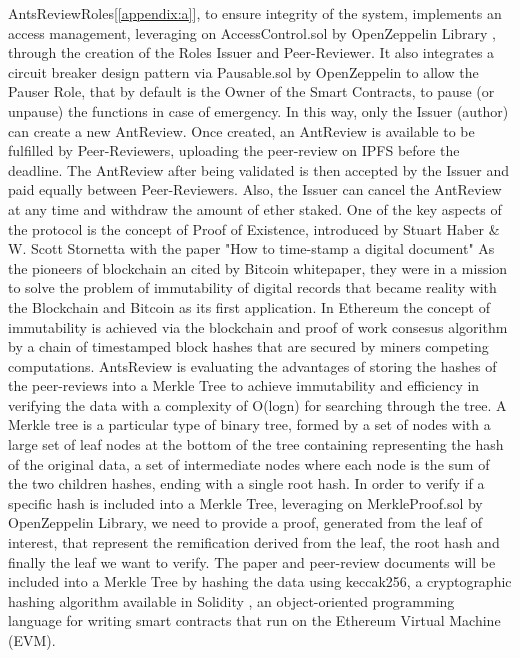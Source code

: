 \documentclass[runningheads]{llncs}
\begin{document}
AntsReviewRoles[\ref{appendix:a}], to ensure integrity of the system, implements an access management, leveraging on AccessControl.sol by OpenZeppelin Library \cite{OZ}, through the creation of the Roles Issuer and Peer-Reviewer.
\newline It also integrates a circuit breaker design pattern via Pausable.sol by OpenZeppelin to allow the Pauser Role, that by default is the Owner of the Smart Contracts, to pause (or unpause) the functions in case of emergency.
\newline In this way, only the Issuer (author) can create a new AntReview.
\newline Once created, an AntReview is available to be fulfilled by Peer-Reviewers, uploading the peer-review on IPFS before the deadline.
\newline The AntReview after being validated is then accepted by the Issuer and paid equally between Peer-Reviewers.
\newline Also, the Issuer can cancel the AntReview at any time and withdraw the amount of ether staked.
\newline One of the key aspects of the protocol is the concept of Proof of Existence, introduced by Stuart Haber \& W. Scott Stornetta with the paper "How to time-stamp a digital document"\cite{TimeStamp-Haber}
\newline As the pioneers of blockchain an cited by Bitcoin whitepaper, they were in a mission to solve the problem of immutability of digital records that became reality with the Blockchain and Bitcoin\cite{Bitcoin} as its first application.
\newline In Ethereum \cite{Ethereum} the concept of immutability is achieved via the blockchain and proof of work consesus algorithm by a chain of timestamped block hashes that are secured by miners competing computations.
\newline AntsReview is evaluating the advantages of storing the hashes of the peer-reviews into a Merkle Tree \cite{BayerHaber1992} to achieve immutability and efficiency in verifying the data with a complexity of O(logn) for searching through the tree.
\newline A Merkle tree is a particular type of binary tree, formed by a set of nodes with a large set of leaf nodes at the bottom of the tree containing representing the hash of the original data, a set of intermediate nodes where each node is the sum of the two children hashes, ending with a single root hash.
\newline In order to verify if a specific hash is included into a Merkle Tree, leveraging on MerkleProof.sol by OpenZeppelin Library, we need to provide a proof, generated from the leaf of interest, that represent the remification derived from the leaf, the root hash and finally the leaf we want to verify.
\newline The paper and peer-review documents will be included into a Merkle Tree by hashing the data using keccak256, a cryptographic hashing algorithm available in Solidity \cite{Solidity}, an object-oriented programming language for writing smart contracts that run on the Ethereum Virtual Machine (EVM).
\end{document}
